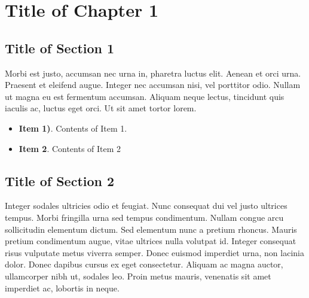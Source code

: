 
\chapter{Title of Chapter 1} %

\label{Chapter1} %


\newcommand{\keyword}[1]{\textbf{#1}}
\newcommand{\tabhead}[1]{\textbf{#1}}
\newcommand{\code}[1]{\texttt{#1}}
\newcommand{\file}[1]{\texttt{\bfseries#1}}
\newcommand{\option}[1]{\texttt{\itshape#1}}


\section{Title of Section 1}

Morbi est justo, accumsan nec urna in, pharetra luctus elit. Aenean et orci urna. Praesent et eleifend augue. Integer nec accumsan nisi, vel porttitor odio. Nullam ut magna eu est fermentum accumsan. Aliquam neque lectus, tincidunt quis iaculis ac, luctus eget orci. Ut sit amet tortor lorem.


\begin{itemize}
\item \textbf{Item 1)}.\newline
  Contents of Item 1.
\item \textbf{Item 2}.\newline
  Contents of Item 2
\end{itemize}



\section{\nohyphens{Title of Section 2}}
Integer sodales ultricies odio et feugiat. Nunc consequat dui vel justo ultrices tempus. Morbi fringilla urna sed tempus condimentum. Nullam congue arcu sollicitudin elementum dictum. Sed elementum nunc a pretium rhoncus. Mauris pretium condimentum augue, vitae ultrices nulla volutpat id. Integer consequat risus vulputate metus viverra semper. Donec euismod imperdiet urna, non lacinia dolor. Donec dapibus cursus ex eget consectetur. Aliquam ac magna auctor, ullamcorper nibh ut, sodales leo. Proin metus mauris, venenatis sit amet imperdiet ac, lobortis in neque.
\newline

